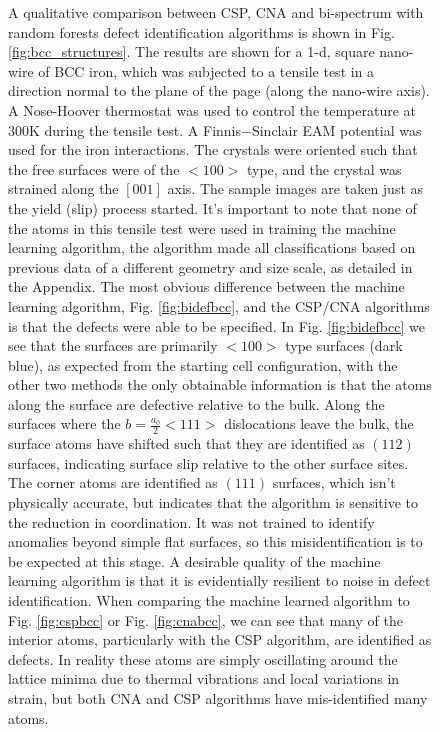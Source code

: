\documentclass[12pt]{iopart}
\begin{document}
\begin{figure}[htbp]
A qualitative comparison between CSP, CNA and bi-spectrum with random forests defect identification algorithms is shown in Fig. \ref{fig:bcc_structures}. The results are shown for a 1-d, square nano-wire of BCC iron, which was subjected to a tensile test in a direction normal to the plane of the page (along the nano-wire axis). A Nose-Hoover thermostat \cite{Hoover1985,Nose1984} was used to control the temperature at 300K during the tensile test. ⁠A Finnis$-$Sinclair EAM potential\cite{Mendelev2003} was used for the iron interactions. The crystals were oriented such that the free surfaces were of the $<100>$ type, and the crystal was strained along the $[001]$ axis. The sample images are taken just as the yield (slip) process started. It's important to note that none of the atoms in this tensile test were used in training the machine learning algorithm, the algorithm made all classifications based on previous data of a different geometry and size scale, as detailed in the Appendix. The most obvious difference between the machine learning algorithm, Fig. \ref{fig:bidefbcc}, and the CSP/CNA algorithms is that the defects were able to be specified. In Fig. \ref{fig:bidefbcc} we see that the surfaces are primarily $<100>$ type surfaces (dark blue), as expected from the starting cell configuration, with the other two methods the only obtainable information is that the atoms along the surface are defective relative to the bulk. Along the surfaces where the $b=\frac{a_0}{2}<111>$ dislocations leave the bulk, the surface atoms have shifted such that they are identified as $(112)$ surfaces, indicating surface slip relative to the other surface sites. The corner atoms are identified as $(111)$ surfaces, which isn't physically accurate, but indicates that the algorithm is sensitive to the reduction in coordination. It was not trained to identify anomalies beyond simple flat surfaces, so this misidentification is to be expected at this stage. A desirable quality of the machine learning algorithm is that it is evidentially resilient to noise in defect identification. When comparing the machine learned algorithm to Fig. \ref{fig:cspbcc} or Fig. \ref{fig:cnabcc}, we can see that many of the interior atoms, particularly with the CSP algorithm, are identified as defects. In reality these atoms are simply oscillating around the lattice minima due to thermal vibrations and local variations in strain, but both CNA and CSP algorithms have mis-identified many atoms.


\end{figure}
\end{document}
